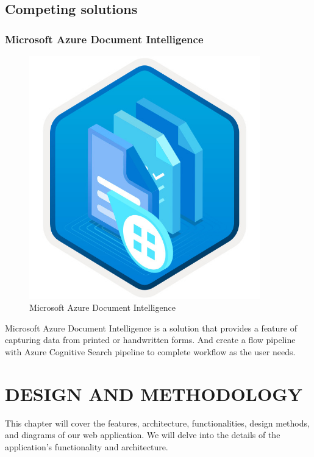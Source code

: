 \documentclass[12pt,oneside,openright,a4paper]{cpe-english-project}
\begin{document}
\section{Competing solutions}
\subsection{Microsoft Azure Document Intelligence}
\begin{figure}[H]
\centering
\includegraphics[width=10cm]{./assets/Microsoft-Azure.jpg}
\caption{Microsoft Azure Document Intelligence}\label{fig:figure-2.4}
\end{figure}

	Microsoft Azure Document Intelligence is a solution that provides a feature of  capturing data from printed or handwritten forms. And create a flow pipeline with Azure Cognitive Search pipeline to complete workflow as the user needs.
\chapter{DESIGN AND METHODOLOGY}

This chapter will cover the features, architecture, functionalities, design methods, and
diagrams of our web application. We will delve into the details of the application’s
functionality and architecture.
\end{document}
